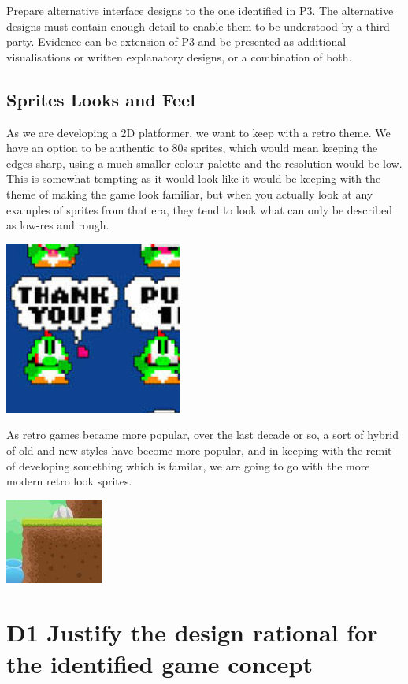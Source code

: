 \documentclass{article}
\begin{document}
Prepare alternative interface designs to the one identified in P3. The alternative designs must contain enough detail to enable them to be understood by a third party. Evidence can be extension of P3 and be presented as additional visualisations or written explanatory designs, or a combination of both.


\subsection{ Sprites Looks and Feel }
As we are developing a 2D platformer, we want to keep with a retro theme. We have an option to be authentic to 80s sprites, which would mean keeping the edges sharp, using a much smaller colour palette and the resolution would be low.
This is somewhat tempting as it would look like it would be keeping with the theme of making the game look familiar, but when you actually look at any examples of sprites from that era, they tend to look what can only be described as low-res and rough.

\includegraphics[scale=0.5]{TraditionalSprite}

As retro games became more popular, over the last decade or so, a sort of hybrid of old and new styles have become more popular, and in keeping with the remit of developing something which is familar, we are going to go with the more modern retro look sprites.

\includegraphics[scale=0.5]{SoftSprite}


\section{D1 Justify the design rational for the identified game concept}
\end{document}
